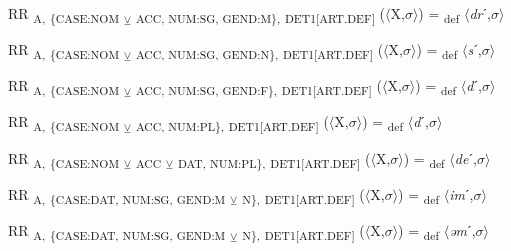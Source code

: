 {\begin{exe}
 RR \textsubscript{A,} \textsubscript{\{CASE:NOM} \textsubscript{${\veebar}$}\textsubscript{ ACC, NUM:SG, GEND:M\},} \textsubscript{DET1[ART.DEF]} ($\langle$X,$\sigma $$\rangle$) = \textsubscript{def} $\langle$\textit{dr}ˊ,$\sigma $$\rangle$
\end{exe}

\begin{exe}
 RR \textsubscript{A,} \textsubscript{\{CASE:NOM} \textsubscript{${\veebar}$}\textsubscript{ ACC, NUM:SG, GEND:N\},} \textsubscript{DET1[ART.DEF]} ($\langle$X,$\sigma $$\rangle$) = \textsubscript{def} $\langle$\textit{s}ˊ,$\sigma $$\rangle$
\end{exe}

\begin{exe}
 RR \textsubscript{A,} \textsubscript{\{CASE:NOM} \textsubscript{${\veebar}$}\textsubscript{ ACC, NUM:SG, GEND:F\},} \textsubscript{DET1[ART.DEF]} ($\langle$X,$\sigma $$\rangle$) = \textsubscript{def} $\langle$\textit{d}ˊ,$\sigma $$\rangle$
\end{exe}

\begin{exe}
 RR \textsubscript{A,} \textsubscript{\{CASE:NOM} \textsubscript{${\veebar}$}\textsubscript{ ACC, NUM:PL\},} \textsubscript{DET1[ART.DEF]} ($\langle$X,$\sigma $$\rangle$) = \textsubscript{def} $\langle$\textit{d}ˊ,$\sigma $$\rangle$
\end{exe}

\begin{exe}
 RR \textsubscript{A,} \textsubscript{\{CASE:NOM} \textsubscript{${\veebar}$}\textsubscript{ ACC} \textsubscript{${\veebar}$}\textsubscript{ DAT, NUM:PL\},} \textsubscript{DET1[ART.DEF]} ($\langle$X,$\sigma $$\rangle$) = \textsubscript{def} $\langle$\textit{de}ˊ,$\sigma $$\rangle$
\end{exe}

\begin{exe}
 RR \textsubscript{A,} \textsubscript{\{CASE:DAT, NUM:SG, GEND:M} \textsubscript{${\veebar}$}\textsubscript{ N\},} \textsubscript{DET1[ART.DEF]} ($\langle$X,$\sigma $$\rangle$) = \textsubscript{def} $\langle$\textit{im}ˊ,$\sigma $$\rangle$
\end{exe}

\begin{exe}
 RR \textsubscript{A,} \textsubscript{\{CASE:DAT, NUM:SG, GEND:M} \textsubscript{${\veebar}$}\textsubscript{ N\},} \textsubscript{DET1[ART.DEF]} ($\langle$X,$\sigma $$\rangle$) = \textsubscript{def} $\langle$\textit{əm}ˊ,$\sigma $$\rangle$
\end{exe}

}
